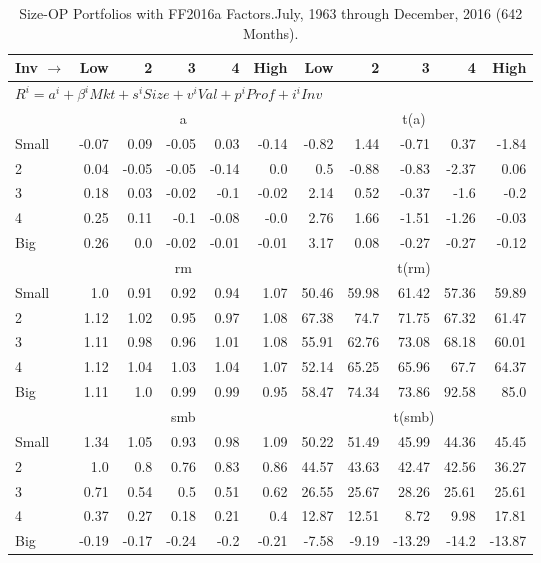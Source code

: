 
\begin{table}[!ht]
\centering
\caption{Size-OP Portfolios with FF2016a Factors.\footnotesize{July, 1963 through December, 2016 (642 Months).}}
\begin{tabular}{lrrrrrrrrrr}
  \toprule
  Inv $\rightarrow$ & Low & 2 & 3 & 4 & High & Low & 2 & 3 & 4 & High \\ 
  \toprule
  \multicolumn{9}{l}{$R^i=a^i+\beta^iMkt+s^iSize+v^iVal+p^iProf+i^iInv$} \\

  

      & \multicolumn{5}{c}{a} & \multicolumn{5}{c}{t(a)} \\
    \cmidrule(r){2-6} \cmidrule(r){7-11}
      Small  & -0.07  & 0.09  & -0.05  & 0.03  & -0.14   & -0.82  & 1.44  & -0.71  & 0.37  & -1.84  \\
          2  & 0.04  & -0.05  & -0.05  & -0.14  & 0.0   & 0.5  & -0.88  & -0.83  & -2.37  & 0.06  \\
          3  & 0.18  & 0.03  & -0.02  & -0.1  & -0.02   & 2.14  & 0.52  & -0.37  & -1.6  & -0.2  \\
          4  & 0.25  & 0.11  & -0.1  & -0.08  & -0.0   & 2.76  & 1.66  & -1.51  & -1.26  & -0.03  \\
      Big    & 0.26  & 0.0  & -0.02  & -0.01  & -0.01   & 3.17  & 0.08  & -0.27  & -0.27  & -0.12  \\

  

      & \multicolumn{5}{c}{rm} & \multicolumn{5}{c}{t(rm)} \\
    \cmidrule(r){2-6} \cmidrule(r){7-11}
      Small  & 1.0  & 0.91  & 0.92  & 0.94  & 1.07   & 50.46  & 59.98  & 61.42  & 57.36  & 59.89  \\
          2  & 1.12  & 1.02  & 0.95  & 0.97  & 1.08   & 67.38  & 74.7  & 71.75  & 67.32  & 61.47  \\
          3  & 1.11  & 0.98  & 0.96  & 1.01  & 1.08   & 55.91  & 62.76  & 73.08  & 68.18  & 60.01  \\
          4  & 1.12  & 1.04  & 1.03  & 1.04  & 1.07   & 52.14  & 65.25  & 65.96  & 67.7  & 64.37  \\
      Big    & 1.11  & 1.0  & 0.99  & 0.99  & 0.95   & 58.47  & 74.34  & 73.86  & 92.58  & 85.0  \\

  

      & \multicolumn{5}{c}{smb} & \multicolumn{5}{c}{t(smb)} \\
    \cmidrule(r){2-6} \cmidrule(r){7-11}
      Small  & 1.34  & 1.05  & 0.93  & 0.98  & 1.09   & 50.22  & 51.49  & 45.99  & 44.36  & 45.45  \\
          2  & 1.0  & 0.8  & 0.76  & 0.83  & 0.86   & 44.57  & 43.63  & 42.47  & 42.56  & 36.27  \\
          3  & 0.71  & 0.54  & 0.5  & 0.51  & 0.62   & 26.55  & 25.67  & 28.26  & 25.61  & 25.61  \\
          4  & 0.37  & 0.27  & 0.18  & 0.21  & 0.4   & 12.87  & 12.51  & 8.72  & 9.98  & 17.81  \\
      Big    & -0.19  & -0.17  & -0.24  & -0.2  & -0.21   & -7.58  & -9.19  & -13.29  & -14.2  & -13.87  \\


\end{tabular}
\end{table}
